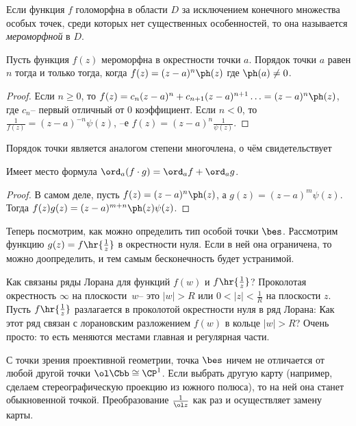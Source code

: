 \documentclass[a4paper]{article}
\begin{document}
\begin{df}
Если функция $f$ голоморфна в области $D$ за исключением конечного множества особых точек, среди которых нет
существенных особенностей, то она называется \emph{мероморфной} в $D$.
\end{df}

\begin{stm}
Пусть функция $f(z)$ мероморфна в окрестности точки $a$. Порядок точки $a$ равен $n$ тогда и только тогда, когда
$f(z)=(z-a)^n\ph(z)$ где $\ph(a) \neq 0$.
\end{stm}
\begin{proof}
Если $n \ge 0$, то $f(z)=c_{n}(z-a)^n+c_{n+1}(z-a)^{n+1}\ldots = (z-a)^n\ph(z)$, где $c_n$-- первый отличный от $0$
коэффициент. Если $n < 0$, то $\frac{1}{f(z)}=(z-a)^{-n}\psi(z)$, --е $f(z)=(z-a)^n\frac{1}{\psi(z)}$.
\end{proof}

Порядок точки является аналогом степени многочлена, о чём свидетельствует
\begin{lemma}
Имеет место формула $\ord_a(f\cdot g) = \ord_a f + \ord_a g$.
\end{lemma}
\begin{proof}
В самом деле, пусть $f(z)=(z-a)^n\ph(z)$, а $g(z)=(z-a)^m\psi(z)$. Тогда $f(z)g(z) = (z-a)^{m+n}\ph(z)\psi(z)$.
\end{proof}


Теперь посмотрим, как можно определить тип особой точки $\bes$. Рассмотрим функцию $g(z)=f\hr{\frac1z}$ в
окрестности нуля. Если в ней она ограничена, то можно доопределить, и тем самым бесконечность будет устранимой.

Как связаны ряды Лорана для функций $f(w)$ и $f\hr{\frac1z}$? Проколотая окрестность $\infty$ на
плоскости~$w$-- это $|w|>R$ или $0<|z|<\frac1R$ на плоскости $z$. Пусть $f\hr{\frac1z}$ разлагается в
проколотой окрестности нуля в ряд Лорана:
Как этот ряд связан с лорановским разложением $f(w)$ в кольце $|w|>R$? Очень просто:
то есть меняются местами главная и регулярная части.

\begin{note}
С точки зрения проективной геометрии, точка $\bes$ ничем не отличается от любой другой точки $\ol \Cbb \cong \CP^1$.
Если выбрать другую карту (например, сделаем стереографическую проекцию из южного полюса), то на ней она
станет обыкновенной точкой. Преобразование $\frac{1}{\ol z}$ как раз и осуществляет замену карты.
\end{note}
\end{document}
